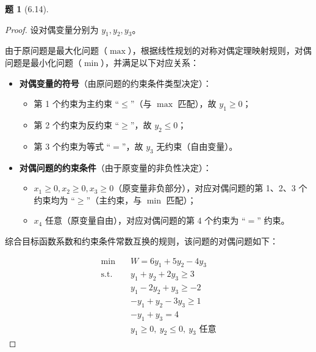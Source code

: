 \documentclass[11pt, a4paper]{article}
\newtheorem{problem}{题}
\begin{document}
\begin{problem}[6.14]
\end{problem}

\begin{proof}
    设对偶变量分别为 $y_1, y_2, y_3$。

    由于原问题是最大化问题（$\max$），根据线性规划的对称对偶定理映射规则，对偶问题是最小化问题（$\min$），并满足以下对应关系：
    \begin{itemize}
        \item \textbf{对偶变量的符号}（由原问题的约束条件类型决定）：
              \begin{itemize}
                  \item 第 1 个约束为主约束 ``$\le$''（与 $\max$ 匹配），故 $y_1 \ge 0$；
                  \item 第 2 个约束为反约束 ``$\ge$''，故 $y_2 \le 0$；
                  \item 第 3 个约束为等式 ``$=$''，故 $y_3$ 无约束（自由变量）。
              \end{itemize}
        \item \textbf{对偶问题的约束条件}（由于原变量的非负性决定）：
              \begin{itemize}
                  \item $x_1 \ge 0, x_2 \ge 0, x_3 \ge 0$（原变量非负部分），对应对偶问题的第 1、2、3 个约束均为 ``$\ge$''（主约束，与 $\min$ 匹配）；
                  \item $x_4$ 任意（原变量自由），对应对偶问题的第 4 个约束为 ``$=$'' 约束。
              \end{itemize}
    \end{itemize}

    综合目标函数系数和约束条件常数互换的规则，该问题的对偶问题如下：

    $$
        \begin{aligned}
            \min \quad & W = 6y_1 + 5y_2 - 4y_3                   \\
            \text{s.t.} \quad
                       & y_1 + y_2 + 2y_3 \ge 3                   \\
                       & y_1 - 2y_2 + y_3 \ge -2                  \\
                       & -y_1 + y_2 - 3y_3 \ge 1                  \\
                       & -y_1 + y_3 = 4                           \\
                       & y_1 \ge 0, \ y_2 \le 0, \ y_3 \text{ 任意}
        \end{aligned}
    $$
\end{proof}

\vspace{1em}
\end{document}
